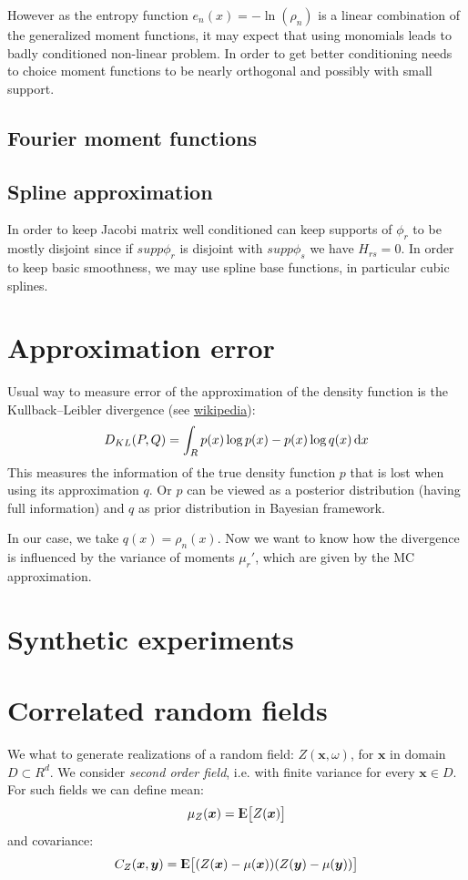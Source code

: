 \documentclass{article}
\def\d{\,{\rm d}}               %
\def\vc#1{\mathbf{\boldsymbol{#1}}}     %
\def \E{{{\rm I\kern-.3em E}}}
\begin{document}
However as the entropy function $e_n(x) = -\ln(\rho_n)$ is a linear combination of the generalized moment functions, it may expect that using monomials leads to badly conditioned non-linear problem. In order to 
get better conditioning needs to choice moment functions to be nearly orthogonal and possibly with small support.

\subsection{Fourier moment functions}


\subsection{Spline approximation}
In order to keep Jacobi matrix well conditioned can keep supports of $\phi_r$ to be mostly disjoint since if $supp \phi_r$ is disjoint with $supp \phi_s$ we have $H_{rs} = 0$.
In order to keep basic smoothness, we may use spline base functions, in particular cubic splines.


\section{Approximation error}
Usual way to measure error of the approximation of the density function is the Kullback–Leibler divergence (see 
\href{https://en.wikipedia.org/wiki/Kullback\%E2\%80\%93Leibler_divergence}{wikipedia}):
\[
D_{KL}(P, Q) = \int_{R} p(x)\log p(x)  - p(x)\log q(x) \d x
\]
This measures the information of the true density function $p$ that is lost when using its approximation $q$. Or $p$ can be viewed as a posterior distribution (having full information) and $q$ as prior distribution in Bayesian framework.

In our case, we take $q(x)=\rho_n(x)$. Now we want to know how the divergence is influenced by the variance of moments $\mu_r'$, which are given by the MC approximation.

\section{Synthetic experiments}
\section{Correlated random fields}
We what to generate realizations of a random field: $Z(\vc x, \omega)$, for $\vc x$ in domain $D \subset R^d$. We consider {\it second order field}, i.e. with finite variance for every $\vc x\in D$. For such fields we can define mean:
\[
    \mu_Z(\vc x) = \E\big[ Z(\vc x) \big]
\]
and covariance:
\[
    C_Z(\vc x, \vc y) = \E\big[ (Z(\vc x) - \mu(\vc x))(Z(\vc y) - \mu(\vc y)) \big]
\]
\end{document}
